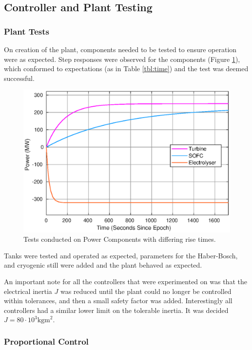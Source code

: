 \subsection{Controller and Plant Testing}
\label{sec:pwrtesting}

\subsubsection{Plant Tests}

On creation of the plant, components needed to be tested to ensure operation were as expected.
Step responses were observed for the components (Figure \ref{fig:power-risetime}), which conformed to expectations (as in Table \ref{tbl:time}) and the test was deemed successful.

\begin{figure}[ht]
    \centering
    \includegraphics[scale=0.5]{images/results/risetime.eps}
    \caption{Tests conducted on Power Components with differing rise times.}
    \label{fig:power-risetime}
\end{figure}

Tanks were tested and operated as expected, parameters for the Haber-Bosch, and cryogenic still were added and the plant behaved as expected.

An important note for all the controllers that were experimented on was that the electrical inertia $J$ was reduced until the plant could no longer be controlled within tolerances, and then a small safety factor was added.
Interestingly all controllers had a similar lower limit on the tolerable inertia.
It was decided $J = 80 \cdot 10^{3}\text{kgm}^{2}$.

\subsubsection{Proportional Control}

